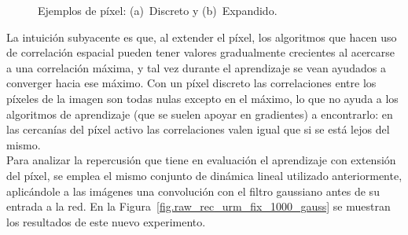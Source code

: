 \begin{figure}[H]
		\begin{center}
	        \caption{Ejemplos de píxel: (a)~Discreto y (b)~Expandido.}
			\label{fig.pixel}
		\end{center}
\end{figure}
\vspace{-10pt}

La intuición subyacente es que, al extender el píxel, los algoritmos que hacen uso de correlación espacial pueden tener valores gradualmente crecientes al acercarse a una correlación máxima, y tal vez durante el aprendizaje se vean ayudados a converger hacia ese máximo. Con un píxel discreto las correlaciones entre los píxeles de la imagen son todas nulas excepto en el máximo, lo que no ayuda a los algoritmos de aprendizaje (que se suelen apoyar en gradientes) a encontrarlo: en las cercanías del píxel activo las correlaciones valen igual que si se está lejos del mismo.\\

Para analizar la repercusión que tiene en evaluación el aprendizaje con extensión del píxel, se emplea el mismo conjunto de dinámica lineal utilizado anteriormente, aplicándole a las imágenes una convolución con el filtro gaussiano antes de su entrada a la red. En la Figura~\ref{fig.raw_rec_urm_fix_1000_gauss} se muestran los resultados de este nuevo experimento.


